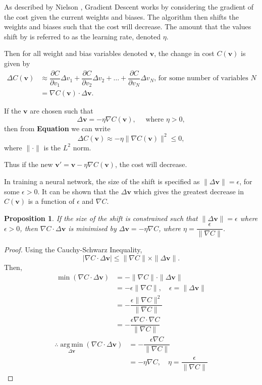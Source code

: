 \documentclass[honours,12pt]{unswthesis}
\newtheorem{proposition}[theorem]{Proposition}
\numberwithin{equation}{section}
\begin{document}
As described by Nielson \cite{Nielson2015}, Gradient Descent works by considering the gradient of the cost given the current weights and biases. The algorithm then shifts the weights and biases such that the cost will decrease. The amount that the values shift by is referred to as the learning rate, denoted $\eta$.

Then for all weight and bias variables denoted $\mathbf{v}$, the change in cost $C(\mathbf{v})$ is given by
\begin{align*}
	\Delta C(\mathbf{v}) & \approx \dfrac{\partial C}{\partial v_1}\Delta v_1 + \dfrac{\partial C}{\partial v_2}\Delta v_2 + \ldots + \dfrac{\partial C}{\partial v_N}\Delta v_N\text{, for some number of variables } N\\
	& = \nabla C(\mathbf{v})\cdot \Delta \mathbf{v}.
\end{align*}

If the $\mathbf{v}$ are chosen such that
\[
	\Delta\mathbf{v} = -\eta \nabla C(\mathbf{v}), \quad \text{ where }\eta > 0,
\]
then from \textbf{Equation} we can write
\[
	\Delta C(\mathbf{v}) \approx -\eta \|\nabla C(\mathbf{v})\|^2 \le 0,
\]
where $\|\cdot\|$ is the $L^2$ norm.

Thus if the new $\mathbf{v}' = \mathbf{v} - \eta \nabla C(\mathbf{v})$, the cost will decrease.

In training a neural network, the size of the shift is specified as $\|\Delta\mathbf{v}\| = \epsilon$, for some $\epsilon > 0$. It can be shown that the $\Delta\mathbf{v}$ which gives the greatest decrease in $C(\mathbf{v})$ is a function of $\epsilon$ and $\nabla C$.

\begin{proposition}\label{nnets-graddescminproof}
	If the size of the shift is constrained such that $\|\Delta\mathbf{v}\| = \epsilon$ where $\epsilon > 0$, then $\nabla C \cdot \Delta\mathbf{v}$ is minimised by $\Delta\mathbf{v} = -\eta\nabla C$, where $\eta = \dfrac{\epsilon}{\|\nabla C\|}$.
\end{proposition}

\begin{proof}
	Using the Cauchy-Schwarz Inequality,
	\[
			|\nabla C\cdot\Delta\mathbf{v}| \le \|\nabla C\|\times\|\Delta\mathbf{v}\|.
	\]
	Then, \begin{align*}
		\min(\nabla C\cdot\Delta\mathbf{v}) & = -\|\nabla C\|\cdot\|\Delta\mathbf{v}\| \\
		& = -\epsilon\|\nabla C\|,\quad\epsilon = \|\Delta\mathbf{v}\| \\
		& = -\dfrac{\epsilon\|\nabla C\|^2}{\|\nabla C\|} \\
		& = -\dfrac{\epsilon\nabla C\cdot\nabla C}{\|\nabla C\|}
	\end{align*}\begin{align*}
		\therefore\operatorname*{arg\,min}_{\Delta\mathbf{v}}(\nabla C\cdot\Delta\mathbf{v}) & = -\dfrac{\epsilon\nabla C}{\|\nabla C\|} \\
		& = -\eta\nabla C,\quad\eta = \dfrac{\epsilon}{\|\nabla C\|}
	\end{align*}
\end{proof}
\end{document}
